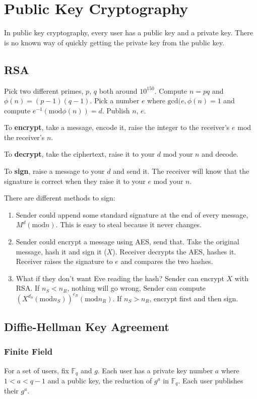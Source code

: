 \documentclass{article}
\begin{document}
\section{Public Key Cryptography}
In public key cryptography, every user has a public key and a private key.
There is no known way of quickly getting the private key from the public key.

\subsection{RSA}
Pick two different primes, $p$, $q$ both around $10^{150}$. Compute $n=pq$ and
$\phi(n)=(p-1)(q-1)$. Pick a number $e$ where $\text{gcd}(e,\phi(n)=1$ and
compute $e^{-1}(\text{mod}\phi(n))=d$. Publish $n$, $e$.

To \textbf{encrypt}, take a message, encode it, raise the integer to the
receiver's $e$ mod the receiver's $n$.

To \textbf{decrypt}, take the ciphertext, raise it to your $d$ mod your $n$ and
decode.

To \textbf{sign}, raise a message to your $d$ and send it. The receiver will
know that the signature is correct when they raise it to your $e$ mod your $n$.

There are different methods to sign:
\begin{enumerate}
  \item Sender could append some standard signature at the end of every
    message, $M^d(\text{mod}n)$. This is easy to steal because it never
    changes.
  \item Sender could encrypt a message using AES, send that. Take the original
    message, hash it and sign it ($X$). Receiver decrypts the AES, hashes it.
    Receiver raises the signature to $e$ and compares the two hashes.
  \item What if they don't want Eve reading the hash? Sender can encrypt $X$
    with RSA. If $n_S < n_{R}$, nothing will go wrong, Sender can compute
    $(X^{d_S} (\text{mod}n_S))^{e_R}(\text{mod}n_R)$. If $n_S > n_R$, encrypt
    first and then sign.
\end{enumerate}

\subsection{Diffie-Hellman Key Agreement}
\subsubsection{Finite Field}
For a set of users, fix $\mathbb{F}_q$ and $g$. Each user has a private key
number $a$ where $1 < a < q-1$ and a public key, the reduction of $g^a$ in
$\mathbb{F}_q$. Each user publishes their $g^a$.
\end{document}
